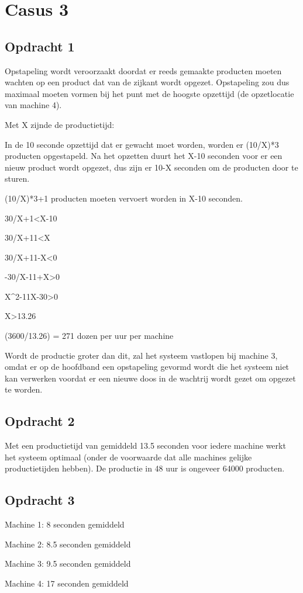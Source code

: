 \chapter{Casus 3}
\section{Opdracht 1}
Opstapeling wordt veroorzaakt doordat er reeds gemaakte producten moeten
wachten op een product dat van de zijkant wordt opgezet. Opstapeling zou
dus maximaal moeten vormen bij het punt met de hoogste opzettijd (de
opzetlocatie van machine 4). 

Met X zijnde de productietijd: 

In de 10 seconde opzettijd dat er gewacht moet worden, worden er
(10/X)*3 producten opgestapeld. Na het opzetten duurt het X-10 seconden
voor er een nieuw product wordt opgezet, dus zijn er 10-X seconden om de
producten door te sturen.

(10/X)*3+1 producten moeten vervoert worden in X-10 seconden. 

30/X+1<X-10

30/X+11<X

30/X+11-X<0

-30/X-11+X>0

X^{2}-11X-30>0

X>13.26

(3600/13.26) = 271 dozen per uur per machine 

Wordt de productie groter dan dit, zal het systeem vastlopen bij machine
3, omdat er op de hoofdband een opstapeling gevormd wordt die het
systeem niet kan verwerken voordat er een nieuwe doos in de wachtrij
wordt gezet om opgezet te worden. 
\section{Opdracht 2}
Met een productietijd van gemiddeld 13.5 seconden voor iedere machine
werkt het systeem optimaal (onder de voorwaarde dat alle machines
gelijke productietijden hebben). De productie in 48 uur is ongeveer
64000 producten. 
\section{Opdracht 3}
Machine 1: 8 seconden gemiddeld

Machine 2: 8.5 seconden gemiddeld

Machine 3: 9.5 seconden gemiddeld

Machine 4: 17 seconden gemiddeld

